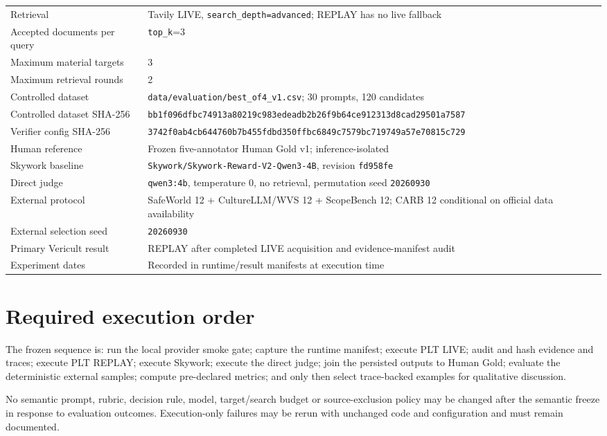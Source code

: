 \begin{longtable}{p{4.7cm}p{8.9cm}}
Retrieval & Tavily LIVE, \texttt{search\_depth=advanced}; REPLAY has no live fallback \\
Accepted documents per query & \texttt{top\_k}=3 \\
Maximum material targets & 3 \\
Maximum retrieval rounds & 2 \\
Controlled dataset & \texttt{data/evaluation/best\_of4\_v1.csv}; 30 prompts, 120 candidates \\
Controlled dataset SHA-256 & \texttt{bb1f096dfbc74913a80219c983edeadb2b26f9b64ce912313d8cad29501a7587} \\
Verifier config SHA-256 & \texttt{3742f0ab4cb644760b7b455fdbd350ffbc6849c7579bc719749a57e70815c729} \\
Human reference & Frozen five-annotator Human Gold v1; inference-isolated \\
Skywork baseline & \texttt{Skywork/Skywork-Reward-V2-Qwen3-4B}, revision \texttt{fd958fe} \\
Direct judge & \texttt{qwen3:4b}, temperature 0, no retrieval, permutation seed \texttt{20260930} \\
External protocol & SafeWorld 12 + CultureLLM/WVS 12 + ScopeBench 12; CARB 12 conditional on official data availability \\
External selection seed & \texttt{20260930} \\
Primary Vericult result & REPLAY after completed LIVE acquisition and evidence-manifest audit \\
Experiment dates & Recorded in runtime/result manifests at execution time \\
\bottomrule
\end{longtable}

\section*{Required execution order}

The frozen sequence is: run the local provider smoke gate; capture the runtime manifest; execute PLT LIVE; audit and hash evidence and traces; execute PLT REPLAY; execute Skywork; execute the direct judge; join the persisted outputs to Human Gold; evaluate the deterministic external samples; compute pre-declared metrics; and only then select trace-backed examples for qualitative discussion.

No semantic prompt, rubric, decision rule, model, target/search budget or source-exclusion policy may be changed after the semantic freeze in response to evaluation outcomes. Execution-only failures may be rerun with unchanged code and configuration and must remain documented.

